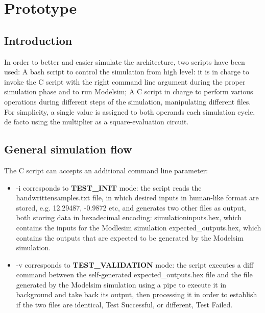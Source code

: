 %
\chapter{Prototype}
\label{chap1}
\graphicspath{ {./chapters/chap1images/} }
\section{Introduction}
In order to better and easier simulate the architecture, two scripts have been used:
A bash script to control the simulation from high level: it is in charge to invoke the C script with the right command line argument during the proper simulation phase and to 
run Modelsim;
A C script in charge to perform various operations during different steps of the simulation, manipulating different files.
For simplicity, a single value is assigned to both operands each simulation cycle, de facto using the multiplier as a square-evaluation circuit.
\section{General simulation flow}
The C script can accepts an additional command line parameter:\begin{itemize}
    \item -i corresponds to \textbf{TEST\_INIT} mode: the script reads the handwrittensamples.txt file, in which desired inputs in human-like format are stored, e.g. 12.29487, -0.9872 etc, 
    and generates two other files as output, both storing data in hexadecimal encoding:
    simulationinputs.hex, which contains the inputs for the Modlesim simulation
    expected\_outputs.hex, which contains the outputs that are expected to be generated by the Modelsim simulation.
    \item -v corresponds to \textbf{TEST\_VALIDATION} mode: the script executes a diff command between the self-generated expected\_outputs.hex file and the file generated by the Modelsim simulation using 
    a pipe to execute it in background and take back its output, then processing it in order to establish if the two files are identical, Test Successful, or different, Test Failed.
    
    \end{itemize} 

